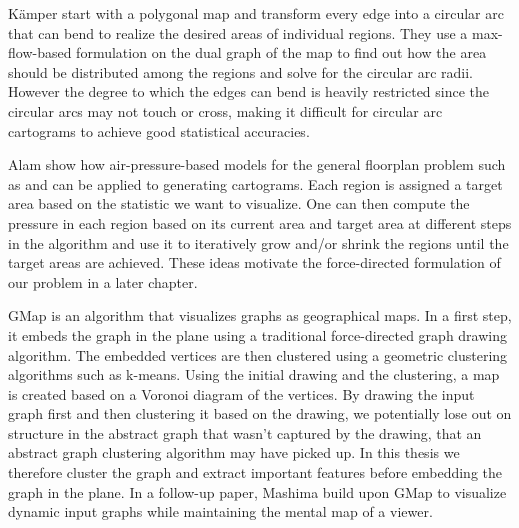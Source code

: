 Kämper \etal{} \cite{kamper2013circular} start with a polygonal map and transform every edge into a circular arc that can bend to realize the desired areas of individual regions. They use a max-flow-based formulation on the dual graph of the map to find out how the area should be distributed among the regions and solve for the circular arc radii. However the degree to which the edges can bend is heavily restricted since the circular arcs may not touch or cross, making it difficult for circular arc cartograms to achieve good statistical accuracies.

Alam \etal{} \cite{alam2013computing} show how air-pressure-based models for the general floorplan problem such as \cite{izumi1998air} and \cite{felsner2013exploiting} can be applied to generating cartograms. Each region is assigned a target area based on the statistic we want to visualize. One can then compute the pressure in each region based on its current area and target area at different steps in the algorithm and use it to iteratively grow and/or shrink the regions until the target areas are achieved. These ideas motivate the force-directed formulation of our problem in a later chapter.

GMap \cite{gansner2009gmap} is an algorithm that visualizes graphs as geographical maps. In a first step, it embeds the graph in the plane using a traditional force-directed graph drawing algorithm. The embedded vertices are then clustered using a geometric clustering algorithms such as k-means. Using the initial drawing and the clustering, a map is created based on a Voronoi diagram of the vertices. By drawing the input graph first and then clustering it based on the drawing, we potentially lose out on structure in the abstract graph that wasn't captured by the drawing, that an abstract graph clustering algorithm may have picked up. In this thesis we therefore cluster the graph and extract important features before embedding the graph in the plane. In a follow-up paper, Mashima \etal{} \cite{mashima2011visualizing} build upon GMap to visualize dynamic input graphs while maintaining the mental map of a viewer.
